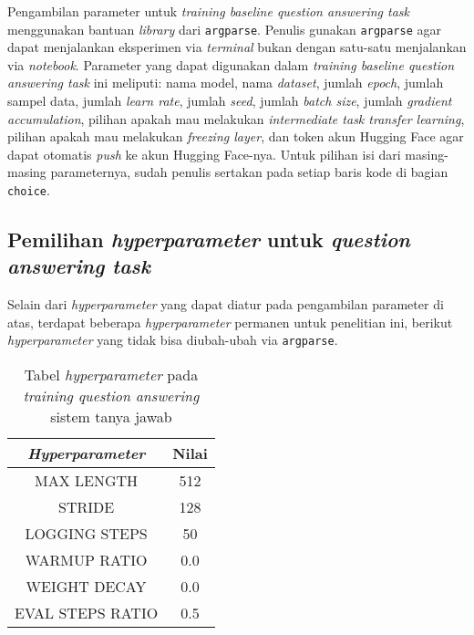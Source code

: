 Pengambilan parameter untuk \emph{training baseline question answering task} menggunakan bantuan \emph{library} dari \texttt{argparse}. Penulis gunakan \texttt{argparse} agar dapat menjalankan eksperimen via \emph{terminal} bukan dengan satu-satu menjalankan via \emph{notebook}. Parameter yang dapat digunakan dalam \emph{training baseline question answering task} ini meliputi: nama model, nama \emph{dataset}, jumlah \emph{epoch}, jumlah sampel data, jumlah \emph{learn rate}, jumlah \emph{seed}, jumlah \emph{batch size}, jumlah \emph{gradient accumulation}, pilihan apakah mau melakukan \emph{intermediate task transfer learning}, pilihan apakah mau melakukan \emph{freezing layer}, dan token akun Hugging Face agar dapat otomatis \emph{push} ke akun Hugging Face-nya. Untuk pilihan isi dari masing-masing parameternya, sudah penulis sertakan pada setiap baris kode di bagian \texttt{choice}.

\subsection{Pemilihan \emph{hyperparameter} untuk \emph{question answering task}}
Selain dari \emph{hyperparameter} yang dapat diatur pada pengambilan parameter di atas, terdapat beberapa \emph{hyperparameter} permanen untuk penelitian ini, berikut \emph{hyperparameter} yang tidak bisa diubah-ubah via \texttt{argparse}.

\begin{table}[h]
\centering
\begin{tabular}{||c | c||} 
 \hline
 \emph{Hyperparameter} & Nilai \\ [0.5ex] 
 \hline\hline
 MAX LENGTH & 512 \\ 
 STRIDE & 128 \\
 LOGGING STEPS & 50 \\
 WARMUP RATIO & 0.0 \\
 WEIGHT DECAY & 0.0 \\ 
 EVAL STEPS RATIO & 0.5 \\ [1ex] 
 \hline\hline
\end{tabular}
\caption{Tabel \emph{hyperparameter} pada \emph{training question answering} sistem tanya jawab}
\end{table}

